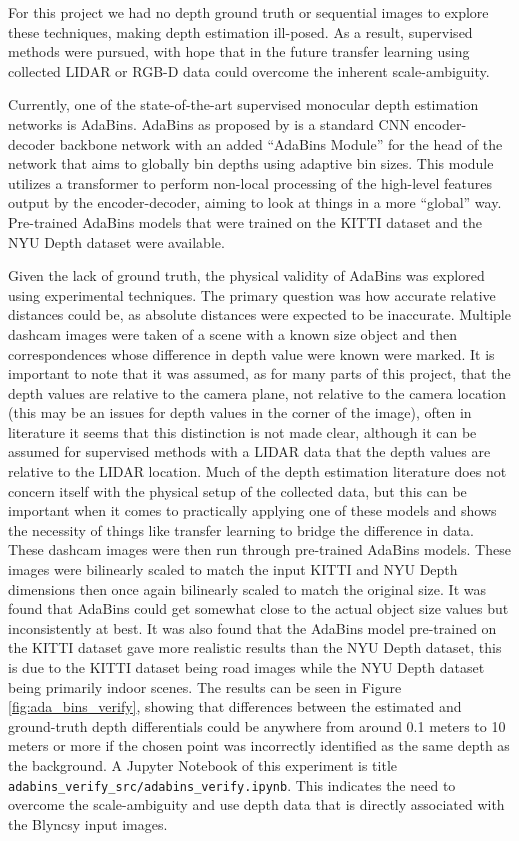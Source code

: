 \documentclass{article}
\begin{document}
For this project we had no depth ground truth or sequential images to explore these techniques, making depth estimation ill-posed.
As a result, supervised methods were pursued, with hope that in the future transfer learning using collected LIDAR or RGB-D data could overcome the inherent scale-ambiguity.

Currently, one of the state-of-the-art supervised monocular depth estimation networks is AdaBins. 
AdaBins as proposed by \cite{AdaBins} is a standard CNN encoder-decoder backbone network with an added ``AdaBins Module'' for the head of the network that aims to globally bin depths using adaptive bin sizes. 
This module utilizes a transformer to perform non-local processing of the high-level features output by the encoder-decoder, aiming to look at things in a more ``global'' way.
Pre-trained AdaBins models that were trained on the KITTI dataset and the NYU Depth dataset were available.

Given the lack of ground truth, the physical validity of AdaBins was explored using experimental techniques.
The primary question was how accurate relative distances could be, as absolute distances were expected to be inaccurate.
Multiple dashcam images were taken of a scene with a known size object and then correspondences whose difference in depth value were known were marked.
It is important to note that it was assumed, as for many parts of this project, that the depth values are relative to the camera plane, not relative to the camera location (this may be an issues for depth values in the corner of the image), often in literature it seems that this distinction is not made clear, although it can be assumed for supervised methods with a LIDAR data that the depth values are relative to the LIDAR location.
Much of the depth estimation literature does not concern itself with the physical setup of the collected data, but this can be important when it comes to practically applying one of these models and shows the necessity of things like transfer learning to bridge the difference in data.
These dashcam images were then run through pre-trained AdaBins models. 
These images were bilinearly scaled to match the input KITTI and NYU Depth dimensions then once again bilinearly scaled to match the original size.
It was found that AdaBins could get somewhat close to the actual object size values but inconsistently at best. 
It was also found that the AdaBins model pre-trained on the KITTI dataset gave more realistic results than the NYU Depth dataset, this is due to the KITTI dataset being road images while the NYU Depth dataset being primarily indoor scenes.
The results can be seen in Figure \ref{fig:ada_bins_verify}, showing that differences between the estimated and ground-truth depth differentials could be anywhere from around 0.1 meters to 10 meters or more if the chosen point was incorrectly identified as the same depth as the background.
A Jupyter Notebook of this experiment is title \verb|adabins_verify_src/adabins_verify.ipynb|.
This indicates the need to overcome the scale-ambiguity and use depth data that is directly associated with the Blyncsy input images.
\end{document}
